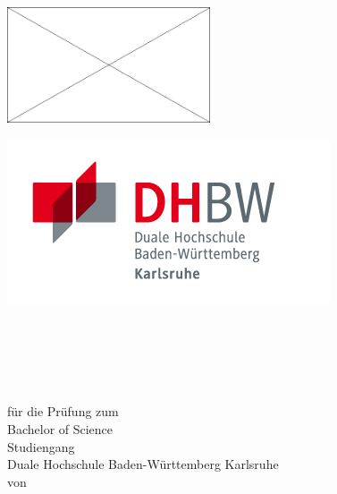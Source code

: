\thispagestyle{plain}
\begin{titlepage}
\enlargethispage{4.0cm}
\sffamily 								%

\begin{minipage}[t][1.8cm][c]{0.481\textwidth}
\begin{flushleft}
\includegraphics[width=6cm]{Images/placeholder.png}
\end{flushleft}
\end{minipage}
\begin{minipage}[t][1.8cm][c]{0.481\textwidth}
\begin{flushright}
\includegraphics[scale=2]{Images/logo_dhbw.jpg}
\end{flushright}
\end{minipage}
\\[5ex]
\begin{center}

\huge{\textsc{\textbf{\titel}}}\\[1ex]
\Large{\textbf{\untertitel}}\\[3ex]
\LARGE{\textbf{\arbeit}}\\[2ex]
\normalsize{für die Prüfung zum\\[1ex] Bachelor of Science}\\[3ex]
\Large{Studiengang \studiengang}\\[1ex]
\normalsize{Duale Hochschule Baden-Württemberg Karlsruhe}\\[5ex]
von\\[1ex] \autor \\[13ex]


\end{center}


\end{titlepage}

